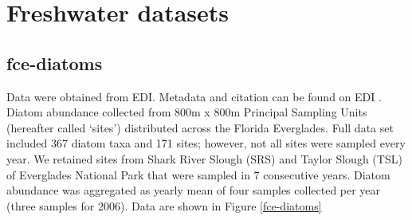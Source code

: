 \documentclass[11pt, oneside]{article}
\begin{document}
\section {Freshwater datasets}

\subsection {fce-diatoms}
Data were obtained from EDI. Metadata and citation can be found on EDI \citep{fce-diatoms}.
Diatom abundance collected from 800m x 800m Principal Sampling Units (hereafter called `sites') distributed across the Florida Everglades. 
Full data set included 367 diatom taxa and 171 sites; however, not all sites were sampled every year. 
We retained sites from Shark River Slough (SRS) and Taylor Slough (TSL) of Everglades National Park that were sampled in 7 consecutive years. 
Diatom abundance was aggregated as yearly mean of four samples collected per year (three samples for 2006). 
Data are shown in Figure \ref{fce-diatoms}
\end{document}
